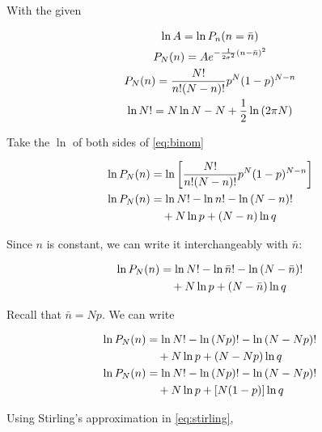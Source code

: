 \documentclass[9pt,a4paper,twocolumn]{article}
\begin{document}
With the given

\begin{gather}
	\ln A = \ln P_n(n = \bar{n}) \label{givenln} \\
	P_N(n) = Ae^{-\frac{1}{2\sigma^2}(n - \bar{n})^2} \label{eq:givenfunc} \\
	P_N(n) = \frac{N!}{n!(N-n)!}p^N(1-p)^{N-n} \label{eq:binom} \\
	\ln N! = N\ln N - N + \frac{1}{2}\ln\qty(2\pi N) \label{eq:stirling}
\end{gather}

Take the $\ln$ of both sides of \eqref{eq:binom}

\begin{align}
	\ln P_N(n) &= \ln\qty[\frac{N!}{n!(N-n)!}p^N(1-p)^{N-n}] \nonumber \\
	\ln P_N(n) &= \ln N! - \ln n! - \ln\qty(N-n)! \nonumber \\
	& \quad + N\ln p + (N-n)\ln q
\end{align}

Since $n$ is constant, we can write it interchangeably with $\bar{n}$:

\begin{align}
	\ln P_N(n) &= \ln N! - \ln \bar{n}! - \ln\qty(N-\bar{n})! \nonumber \\
	& \quad + N\ln p + (N-\bar{n})\ln q
\end{align}

Recall that $\bar{n} = Np$. We can write

\begin{align}
	\ln P_N(n) &= \ln N! - \ln\qty(Np)! - \ln\qty(N - Np)! \nonumber \\
	& \quad + N \ln p + (N - Np)\ln q \nonumber \\
	\ln P_N(n) &= \ln N! - \ln\qty(Np)! - \ln\qty(N - Np)! \nonumber \\
	& \quad + N \ln p + [N(1-p)]\ln q
\end{align}

Using Stirling's approximation in \eqref{eq:stirling},
\end{document}
